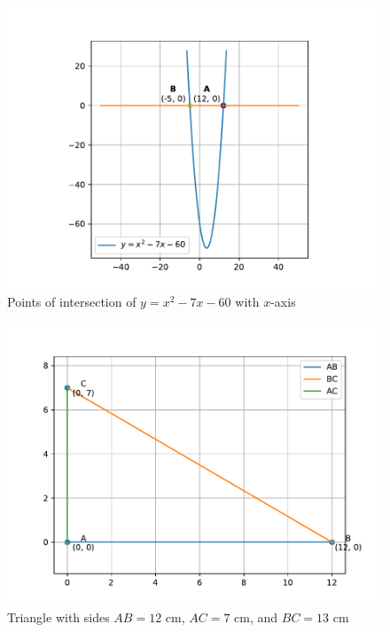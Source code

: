 \documentclass[journal]{IEEEtran}
\begin{document}
\begin{figure}[h!]
    \centering
    \includegraphics[width=0.7\linewidth]{figs/parabola.pdf}
    \caption{Points of intersection of $y = x^2 - 7x - 60$ with $x$-axis}
\end{figure}

\begin{figure}[h!]
    \centering
    \includegraphics[width=0.7\linewidth]{figs/triangle.pdf}
    \caption{Triangle with sides $AB = 12$ cm, $AC = 7$ cm, and $BC = 13$ cm}
\end{figure}
\end{document}
